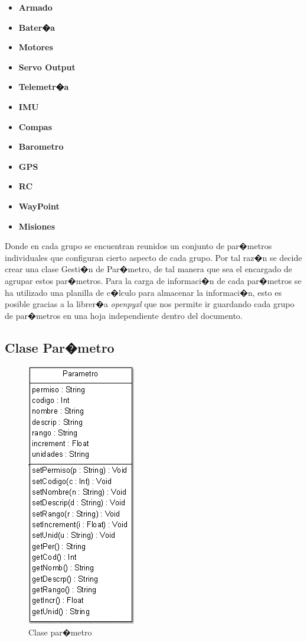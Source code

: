 \begin{itemize}
	\item \textbf{Armado}
	\item \textbf{Bater�a}
	\item \textbf{Motores}
	\item \textbf{Servo Output}
	\item \textbf{Telemetr�a}
	\item \textbf{IMU}
	\item \textbf{Compas}
	\item \textbf{Barometro}
	\item \textbf{GPS}
	\item \textbf{RC}
	\item \textbf{WayPoint}
	\item \textbf{Misiones}
\end{itemize} %


Donde en cada grupo se encuentran reunidos un conjunto de par�metros individuales que configuran cierto aspecto de cada grupo. Por tal raz�n se decide crear una clase Gesti�n de Par�metro, de tal manera que sea el encargado de agrupar estos par�metros. Para la carga de informaci�n de cada par�metros se ha utilizado una planilla de c�lculo para almacenar la informaci�n, esto es posible gracias a la librer�a \textit{openpyxl} que nos permite ir guardando cada grupo de par�metros en una hoja independiente dentro del documento.
\newpage


\subsection{Clase Par�metro}

\begin{figure}[h!]
	\centering
	\includegraphics[width=0.3\linewidth, height=0.3\textheight]{Imagenes/classParametro}
	\caption{Clase par�metro}
	\label{fig:classparametro}
\end{figure}

